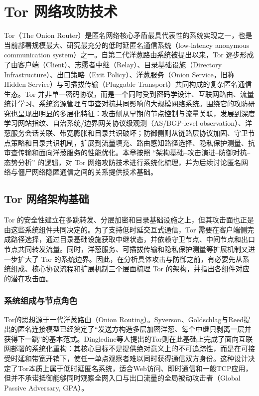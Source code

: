 \section{Tor 网络攻防技术}

Tor（The Onion Router）是匿名网络核心矛盾最具代表性的系统实现之一，也是当前部署规模最大、研究最充分的低时延匿名通信系统（low-latency anonymous communication system）之一。自第二代洋葱路由系统被提出以来，Tor 逐步形成了由客户端（Client）、志愿者中继（Relay）、目录基础设施（Directory Infrastructure）、出口策略（Exit Policy）、洋葱服务（Onion Service，旧称 Hidden Service）与可插拔传输（Pluggable Transport）共同构成的复杂匿名通信生态\cite{dingledine2004tor,torspec}。Tor 并非单一密码协议，而是一个同时受到密码学设计、互联网路由、流量统计学习、系统资源管理与审查对抗共同影响的大规模网络系统。围绕它的攻防研究也呈现出明显的多层化特征：攻击侧从早期的节点控制与流量关联，发展到深度学习网站指纹、自治系统/边界网关协议级观测（AS/BGP-level observation）、洋葱服务会话关联、带宽膨胀和目录共识破坏；防御侧则从链路层协议加固、守卫节点策略和目录共识机制，扩展到流量填充、路由感知路径选择、隐私保护测量、抗审查传输和面向洋葱服务的性能优化。本章按照 “架构基础–攻击演进–防御对抗–态势分析” 的逻辑，对 Tor 网络攻防技术进行系统化梳理，并为后续讨论匿名网络与僵尸网络隐匿通信之间的关系提供技术基础。

\subsection{Tor 网络架构基础}

Tor 的安全性建立在多跳转发、分层加密和目录基础设施之上，但其攻击面也正是由这些系统组件共同决定的。为了支持低时延交互式通信，Tor 需要在客户端侧完成路径选择，通过目录基础设施获取中继状态，并依赖守卫节点、中间节点和出口节点共同转发流量。同时，洋葱服务、可插拔传输和隐私保护测量等扩展机制又进一步扩大了 Tor 的系统边界。因此，在分析具体攻击与防御之前，有必要先从系统组成、核心协议流程和扩展机制三个层面梳理 Tor 的架构，并指出各组件对应的潜在攻击面。

\subsubsection{系统组成与节点角色}

Tor的思想源于一代洋葱路由（Onion Routing）。Syverson、Goldschlag与Reed提出的匿名连接模型已经奠定了“发送方构造多层加密洋葱、每个中继只剥离一层并获得下一跳”的基本范式\cite{syverson1997anonymous}。Dingledine等人提出的Tor则在此基础上完成了面向互联网部署的系统化重构：其核心目标不是提供绝对意义上的不可追踪性，而是在可接受时延和带宽开销下，使任一单点观察者难以同时获得通信双方身份\cite{dingledine2004tor}。这种设计决定了Tor本质上属于低时延匿名系统，适合Web访问、即时通信和一般TCP应用，但并不承诺抵御能够同时观察全网入口与出口流量的全局被动攻击者（Global Passive Adversary, GPA）。

